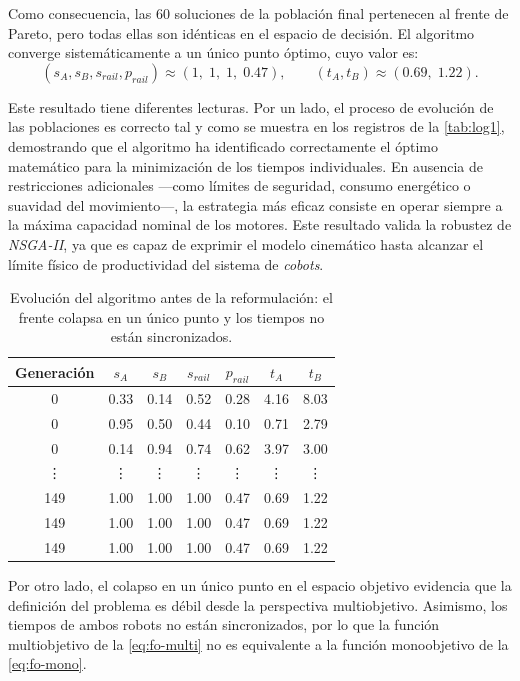 Como consecuencia, las 60 soluciones de la población final pertenecen al frente de Pareto, pero todas ellas son 
idénticas en el espacio de decisión. El algoritmo converge sistemáticamente a un único punto óptimo, cuyo valor es:
\[
(s_A, s_B, s_{rail}, p_{rail}) \approx (1,\;1,\;1,\;0.47),
\qquad
(t_A, t_B) \approx (0.69,\;1.22).
\]

Este resultado tiene diferentes lecturas. Por un lado, el proceso de evolución de las poblaciones es correcto tal y 
como se muestra en los registros de la \autoref{tab:log1}, demostrando que el algoritmo ha 
identificado correctamente el óptimo matemático para la minimización de los tiempos individuales.
En ausencia de restricciones adicionales —como límites de seguridad,
consumo energético o suavidad del movimiento—, 
la estrategia más eficaz consiste en operar siempre a la máxima capacidad nominal de los motores. Este resultado valida la 
robustez de \textit{NSGA-II}, ya que es capaz de exprimir el modelo cinemático hasta alcanzar el límite físico de productividad del sistema 
de \textit{cobots}.

\begin{table}[h!]
\footnotesize
\centering
\begin{tabular}{c|cccc|cc}
\textbf{Generación} & $s_A$ & $s_B$ & $s_{rail}$ & $p_{rail}$ & $t_A$ & $t_B$ \\
\hline
0 & 0.33 & 0.14 & 0.52 & 0.28 & 4.16 & 8.03 \\
0 & 0.95 & 0.50 & 0.44 & 0.10 & 0.71 & 2.79 \\
0 & 0.14 & 0.94 & 0.74 & 0.62 & 3.97 & 3.00 \\
\vdots & \vdots & \vdots & \vdots & \vdots & \vdots & \vdots \\
149 & 1.00 & 1.00 & 1.00 & 0.47 & 0.69 & 1.22 \\
149 & 1.00 & 1.00 & 1.00 & 0.47 & 0.69 & 1.22 \\
149 & 1.00 & 1.00 & 1.00 & 0.47 & 0.69 & 1.22 \\
\end{tabular}
\caption{Evolución del algoritmo antes de la reformulación: el frente colapsa en un único punto y 
los tiempos no están sincronizados.} \label{tab:log1}
\end{table}

Por otro lado, el colapso en un único punto en el espacio objetivo evidencia que la definición 
del problema es débil desde la perspectiva multiobjetivo. Asimismo, los tiempos de ambos robots no están sincronizados, 
por lo que la función multiobjetivo de la \autoref{eq:fo-multi} no es equivalente a la función monoobjetivo 
de la \autoref{eq:fo-mono}. \\

